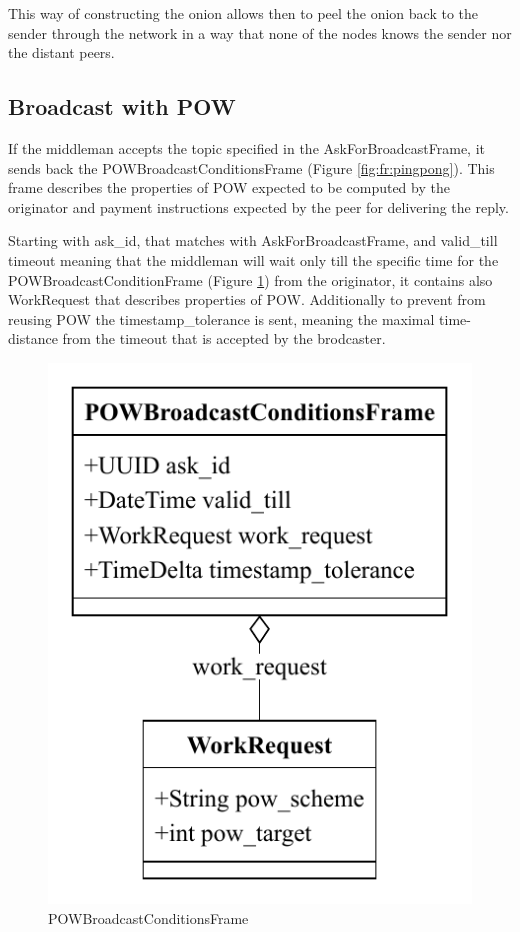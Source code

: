 \documentclass{article}
\begin{document}
This way of constructing the onion allows then to peel the onion back to the sender through the network in a way that none of the nodes knows the sender nor the distant peers.

\subsection{Broadcast with POW} 

If the middleman accepts the topic specified in the AskForBroadcastFrame, it sends back the POWBroadcastConditionsFrame (Figure \ref{fig:fr:pingpong}). This frame describes the properties of POW expected to be computed by the originator and payment instructions expected by the peer for delivering the reply.



Starting with ask\_id, that matches with AskForBroadcastFrame, and valid\_till timeout meaning that the middleman will wait only till the specific time for the POWBroadcastConditionFrame (Figure \ref{fig:fr:powbroadcastcondition}) from the originator, it contains also WorkRequest that describes properties of POW. Additionally to prevent from reusing POW the timestamp\_tolerance is sent, meaning the maximal time-distance from the timeout that is accepted by the brodcaster.

\begin{figure}
	\centering
	\includegraphics[scale=0.7]{POWBroadcastCondition.pdf}
	\caption{POWBroadcastConditionsFrame}
	\label{fig:fr:powbroadcastcondition}
\end{figure}
\end{document}
